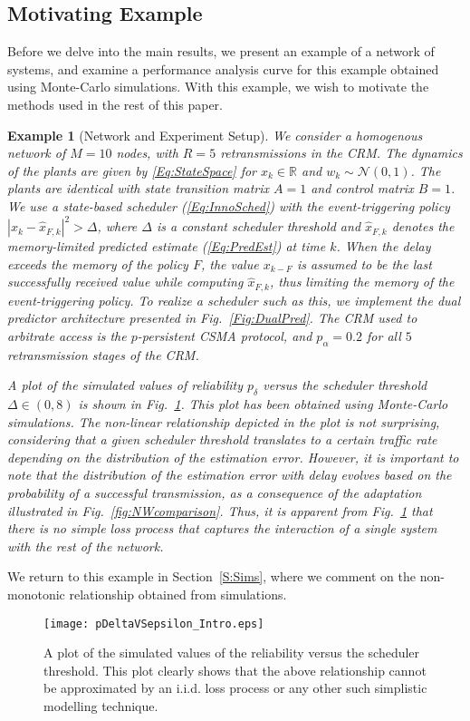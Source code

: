 \documentclass[journal]{IEEEtran}
\newtheorem{example}{Example}[section]
\begin{document}
\subsection{Motivating Example}
Before we delve into the main results, we present an example of a network of systems, and examine a performance analysis curve for this example obtained using Monte-Carlo simulations. With this example, we wish to motivate the methods used in the rest of this paper.
\begin{example}[Network and Experiment Setup] \label{Ex:Setup}
We consider a homogenous network of $M=10$ nodes, with $R=5$ retransmissions in the CRM. The dynamics of the plants are given by \eqref{Eq:StateSpace} for $x_k \in \mathbb{R}$ and $w_k \sim \mathcal{N}(0,1)$. The plants are identical with state transition matrix $A = 1$ and control matrix $B = 1$. We use a state-based scheduler (\ref{Eq:InnoSched}) with the event-triggering policy $| x_k - \hat{x}_{F,k} | ^2 > \Delta$, where $\Delta$ is a constant scheduler threshold and $\hat{x}_{F,k}$ denotes the memory-limited predicted estimate (\ref{Eq:PredEst}) at time $k$. When the delay exceeds the memory of the policy $F$, the value $x_{k-F}$ is assumed to be the last successfully received value while computing $\hat{x}_{F,k}$, thus limiting the memory of the event-triggering policy. To realize a scheduler such as this, we implement the dual predictor architecture presented in Fig.~\ref{Fig:DualPred}. The CRM used to arbitrate access is the $p$-persistent CSMA protocol, and $p_\alpha = 0.2$ for all $5$ retransmission stages of the CRM.

A plot of the simulated values of reliability $p_\delta$ versus the scheduler threshold $\Delta \in (0,8)$ is shown in Fig.~\ref{Fig:pDeltaVSepsilonTeaser}. This plot has been obtained using Monte-Carlo simulations. The non-linear relationship depicted in the plot is not surprising, considering that a given scheduler threshold translates to a certain traffic rate depending on the distribution of the estimation error. However, it is important to note that the distribution of the estimation error with delay evolves based on the probability of a successful transmission, as a consequence of the adaptation illustrated in Fig.~\ref{fig:NWcomparison}. Thus, it is apparent from Fig.~\ref{Fig:pDeltaVSepsilonTeaser} that there is no simple loss process that captures the interaction of a single system with the rest of the network.
\end{example}

We return to this example in Section~\ref{S:Sims}, where we comment on the non-monotonic relationship obtained from simulations.
\begin{figure}[tb]
\begin{center}
\texttt{[image: pDeltaVSepsilon\_Intro.eps]}
\caption{A plot of the simulated values of the reliability versus the scheduler threshold. This plot clearly shows that the above relationship cannot be approximated by an i.i.d. loss process or any other such simplistic modelling technique. } \label{Fig:pDeltaVSepsilonTeaser}
\end{center}
\vspace{-5mm}
\end{figure}
\end{document}
